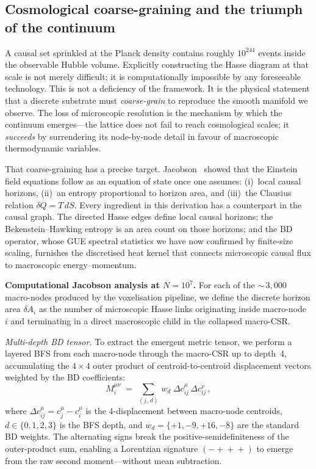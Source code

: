 \documentclass[aps,prd,twocolumn,superscriptaddress,nofootinbib,amsmath,amssymb,longbibliography]{revtex4-2}
\begin{document}
\subsection{Cosmological coarse-graining and the triumph of the continuum}
\label{sec:coarse-graining}

A causal set sprinkled at the Planck density contains roughly $10^{244}$
events inside the observable Hubble volume.  Explicitly constructing the
Hasse diagram at that scale is not merely difficult; it is
computationally impossible by any foreseeable technology.  This is not a
deficiency of the framework.  It is the physical statement that a
discrete substrate must \emph{coarse-grain} to reproduce the smooth
manifold we observe.  The loss of microscopic resolution is the
mechanism by which the continuum emerges---the lattice does not fail to
reach cosmological scales; it \emph{succeeds} by surrendering its
node-by-node detail in favour of macroscopic thermodynamic variables.

That coarse-graining has a precise target.
Jacobson~\cite{jacobson1995} showed that the Einstein field equations
follow as an equation of state once one assumes: (i)~local causal
horizons, (ii)~an entropy proportional to horizon area, and
(iii)~the Clausius relation $\delta Q = T\,dS$.  Every ingredient in
this derivation has a counterpart in the causal graph.  The directed
Hasse edges define local causal horizons; the Bekenstein--Hawking
entropy is an area count on those horizons; and the BD operator,
whose GUE spectral statistics we have now confirmed by finite-size
scaling, furnishes the discretised heat kernel that connects
microscopic causal flux to macroscopic energy--momentum.

\textbf{Computational Jacobson analysis at $N = 10^{7}$.}
For each of the ${\sim}\,3{,}000$ macro-nodes produced by the
voxelisation pipeline, we define the discrete horizon area $\delta A_i$
as the number of microscopic Hasse links originating inside
macro-node~$i$ and terminating in a direct macroscopic child in the
collapsed macro-CSR.

\emph{Multi-depth BD tensor.}
To extract the emergent metric tensor, we perform a layered BFS from
each macro-node through the macro-CSR up to depth~4, accumulating the
$4 \times 4$ outer product of centroid-to-centroid displacement vectors
weighted by the BD coefficients:
\begin{equation}\label{eq:fisher-multidepth}
  M^{\mu\nu}_i \;=\;
    \sum_{(j,\,d)}\, w_d\;\Delta c^\mu_{ij}\,\Delta c^\nu_{ij}\,,
\end{equation}
where $\Delta c^\mu_{ij} = c^\mu_j - c^\mu_i$ is the 4-displacement
between macro-node centroids, $d \in \{0,1,2,3\}$ is the BFS depth,
and $w_d = \{+1, -9, +16, -8\}$ are the standard BD weights.
The alternating signs break the positive-semidefiniteness of the
outer-product sum, enabling a Lorentzian signature $(-\!+\!+\!+)$ to
emerge from the raw second moment---without mean subtraction.
\end{document}
